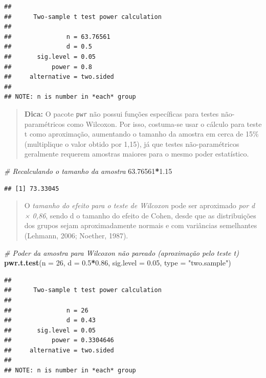 \documentclass[
]{book}
\newenvironment{Shaded}{\begin{snugshade}}{\end{snugshade}}
\newcommand{\AttributeTok}[1]{\textcolor[rgb]{0.13,0.29,0.53}{#1}}
\newcommand{\CommentTok}[1]{\textcolor[rgb]{0.56,0.35,0.01}{\textit{#1}}}
\newcommand{\DecValTok}[1]{\textcolor[rgb]{0.00,0.00,0.81}{#1}}
\newcommand{\FloatTok}[1]{\textcolor[rgb]{0.00,0.00,0.81}{#1}}
\newcommand{\FunctionTok}[1]{\textcolor[rgb]{0.13,0.29,0.53}{\textbf{#1}}}
\newcommand{\NormalTok}[1]{#1}
\newcommand{\SpecialCharTok}[1]{\textcolor[rgb]{0.81,0.36,0.00}{\textbf{#1}}}
\newcommand{\StringTok}[1]{\textcolor[rgb]{0.31,0.60,0.02}{#1}}
\begin{document}
\begin{verbatim}
## 
##      Two-sample t test power calculation 
## 
##               n = 63.76561
##               d = 0.5
##       sig.level = 0.05
##           power = 0.8
##     alternative = two.sided
## 
## NOTE: n is number in *each* group
\end{verbatim}

\begin{quote}
\textbf{Dica:} O pacote \texttt{pwr} não possui funções específicas para testes não-paramétricos como Wilcoxon. Por isso, costuma-se usar o cálculo para teste t como aproximação, aumentando o tamanho da amostra em cerca de 15\% (multiplique o valor obtido por 1,15), já que testes não-paramétricos geralmente requerem amostras maiores para o mesmo poder estatístico.
\end{quote}

\begin{Shaded}
\begin{Highlighting}[]
\CommentTok{\# Recalculando o tamanho da amostra}
\FloatTok{63.76561}\SpecialCharTok{*}\FloatTok{1.15}
\end{Highlighting}
\end{Shaded}

\begin{verbatim}
## [1] 73.33045
\end{verbatim}

\begin{quote}
O \emph{tamanho do efeito para o teste de Wilcoxon} pode ser aproximado \emph{por d × 0,86}, sendo d o tamanho do efeito de Cohen, desde que as distribuições dos grupos sejam aproximadamente normais e com variâncias semelhantes (Lehmann, 2006; Noether, 1987).
\end{quote}

\begin{Shaded}
\begin{Highlighting}[]
\CommentTok{\# Poder da amostra para Wilcoxon não pareado (aproximação pelo teste t)}
\FunctionTok{pwr.t.test}\NormalTok{(}\AttributeTok{n =} \DecValTok{26}\NormalTok{, }\AttributeTok{d =} \FloatTok{0.5}\SpecialCharTok{*}\FloatTok{0.86}\NormalTok{, }\AttributeTok{sig.level =} \FloatTok{0.05}\NormalTok{, }\AttributeTok{type =} \StringTok{"two.sample"}\NormalTok{)}
\end{Highlighting}
\end{Shaded}

\begin{verbatim}
## 
##      Two-sample t test power calculation 
## 
##               n = 26
##               d = 0.43
##       sig.level = 0.05
##           power = 0.3304646
##     alternative = two.sided
## 
## NOTE: n is number in *each* group
\end{verbatim}
\end{document}
